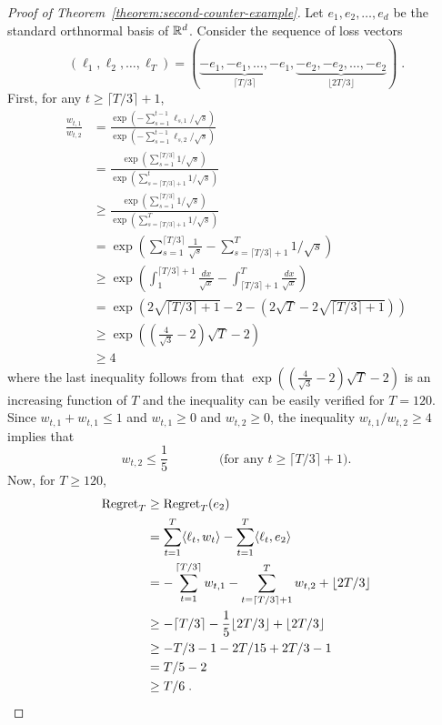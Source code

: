 \begin{proof}[Proof of Theorem~\ref{theorem:second-counter-example}]
Let $e_1, e_2, \dots, e_d$ be the standard orthnormal basis of $\mathbb{R}^d$. Consider the sequence of loss vectors
$$
(\ell_1, \ell_2, \dots, \ell_T) = ( \underbrace{-e_1, -e_1, \dots, -e_1}_{\lceil T/3 \rceil}, \underbrace{-e_2, -e_2, \dots, -e_2}_{\lfloor 2T/3 \rfloor}) \; .
$$
First, for any $t \ge \lceil T/3 \rceil + 1$,
\begin{align*}
\frac{w_{t,1}}{w_{t,2}}
& = \frac{\exp(-\sum_{s=1}^{t-1} \ell_{s,1}/\sqrt{s})}{\exp(-\sum_{s=1}^{t-1} \ell_{s,2}/\sqrt{s})} \\
& = \frac{\exp(\sum_{s=1}^{\lceil T/3 \rceil} 1/\sqrt{s})}{\exp(\sum_{s=\lceil T/3 \rceil + 1}^t 1/\sqrt{s})} \\
& \ge \frac{\exp(\sum_{s=1}^{\lceil T/3 \rceil} 1/\sqrt{s})}{\exp(\sum_{s=\lceil T/3 \rceil + 1}^T 1/\sqrt{s})} \\
& = \exp\left(\sum_{s=1}^{\lceil T/3 \rceil} \frac{1}{\sqrt{s}} - \sum_{s=\lceil T/3 \rceil + 1}^T 1/\sqrt{s} \right) \\
& \ge \exp\left( \int_{1}^{\lceil T/3 \rceil + 1} \frac{dx}{\sqrt{x}} - \int_{\lceil T/3 \rceil + 1}^T \frac{dx}{\sqrt{x}} \right) \\
& = \exp\left( 2\sqrt{\lceil T/3 \rceil + 1} - 2 - (2\sqrt{T} - 2 \sqrt{\lceil T/3 \rceil + 1}) \right) \\
& \ge \exp\left( \left( \frac{4}{\sqrt{3}} - 2 \right) \sqrt{T} - 2 \right) \\
& \ge 4
\end{align*}
where the last inequality follows from that $\exp\left( \left(
\frac{4}{\sqrt{3}} - 2 \right) \sqrt{T} - 2 \right)$ is an increasing function
of $T$ and the inequality can be easily verified for $T=120$. Since $w_{t,1} +
w_{t,1} \le 1$ and $w_{t,1} \ge 0$ and $w_{t,2} \ge 0$, the inequality $w_{t,1}/w_{t,2} \ge 4$ implies that
$$
w_{t,2} \le \frac{1}{5} \qquad \qquad \text{(for any $t \ge \lceil T/3 \rceil + 1$)}.
$$
Now, for $T \ge 120$,
\begin{align*}
\operatorname{Regret}_T
& \ge \operatorname{Regret}_T(e_2) \\
& = \sum_{t=1}^T \langle \ell_t, w_t \rangle - \sum_{t=1}^T \langle \ell_t, e_2 \rangle \\
& = - \sum_{t=1}^{\lceil T/3 \rceil} w_{t,1} - \sum_{t=\lceil T/3 \rceil + 1}^T w_{t,2}  +  \lfloor 2T/3 \rfloor \\
& \ge - \lceil T/3 \rceil - \frac{1}{5} \lfloor 2T/3 \rfloor  +  \lfloor 2T/3 \rfloor \\
& \ge - T/3 - 1 - 2T/15 + 2T/3 - 1 \\
& = T/5 - 2 \\
& \ge T/6 \; .
\end{align*}
\end{proof}

